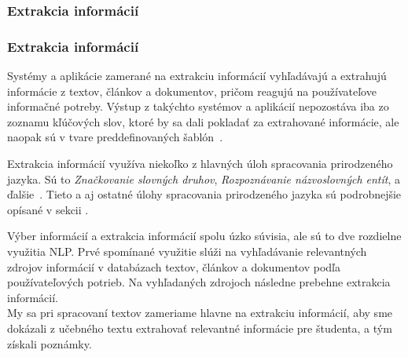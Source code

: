 %
%
{
	\subsubsection{Extrakcia informácií}
}
{
	\subsubsection{Extrakcia informácií}
}
\label{subsubsec:information_extraction}
Systémy a aplikácie zamerané na extrakciu informácií vyhľadávajú a extrahujú informácie z textov, článkov a dokumentov, pričom reagujú na používateľove informačné potreby. Výstup z takýchto systémov a aplikácií nepozostáva iba zo zoznamu kľúčových slov, ktoré by sa dali pokladať za extrahované informácie, ale naopak sú v tvare preddefinovaných šablón~\cite{Preeti}.

Extrakcia informácií využíva niekoľko z hlavných úloh spracovania prirodzeného jazyka. Sú to \textit{Značkovanie slovných druhov}, \textit{Rozpoznávanie názvoslovných entít}, a ďalšie~\cite{Preeti}. Tieto a aj ostatné úlohy spracovania prirodzeného jazyka sú podrobnejšie opísané v sekcii .

Výber informácií a extrakcia informácií spolu úzko súvisia, ale sú to dve rozdielne využitia NLP. Prvé spomínané využitie slúži na vyhľadávanie relevantných zdrojov informácií v databázach textov, článkov a dokumentov podľa používateľových potrieb. Na vyhľadaných zdrojoch následne prebehne extrakcia informácií. 
\\

My sa pri spracovaní textov zameriame hlavne na extrakciu informácií, aby sme dokázali z učebného textu extrahovať relevantné informácie pre študenta, a tým získali poznámky.

